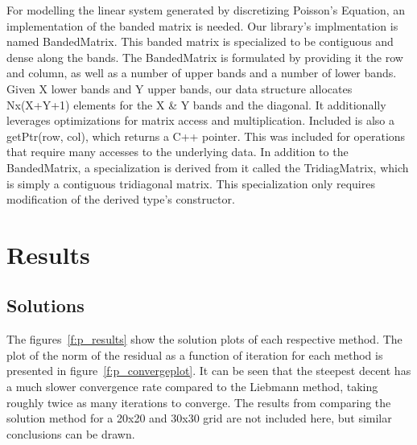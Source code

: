 \documentclass[]{aiaa-tc}%
\begin{document}
For modelling the linear system generated by discretizing Poisson's Equation, an implementation of the banded matrix is needed. Our library's implmentation is named BandedMatrix. This banded matrix is specialized to be contiguous and dense along the bands. The BandedMatrix is formulated by providing it the row and column, as well as a number of upper bands and a number of lower bands. Given X lower bands and Y upper bands, our data structure allocates Nx(X+Y+1) elements for the X \& Y bands and the diagonal. It additionally leverages optimizations for matrix access and multiplication. Included is also a getPtr(row, col), which returns a C++ pointer. This was included for operations that require many accesses to the underlying data. In addition to the BandedMatrix, a specialization is derived from it called the TridiagMatrix, which is simply a contiguous tridiagonal matrix. This specialization only requires modification of the derived type's constructor. 

\FloatBarrier\section{Results}

\FloatBarrier\subsection{Solutions}

The figures~\ref{f:p_results} show the solution plots of each respective method.
The plot of the norm of the residual as a function of iteration for each method
is presented in figure~\ref{f:p_convergeplot}. It can be seen that the steepest decent
has a much slower convergence rate compared to the Liebmann method, taking roughly
twice as many iterations to converge. The results from comparing the solution method
for a 20x20 and 30x30 grid are not included here, but similar conclusions can be drawn. 
\end{document}
